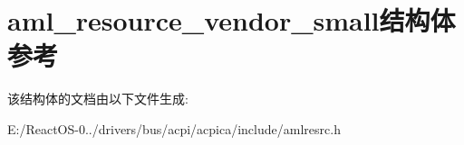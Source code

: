 \hypertarget{structaml__resource__vendor__small}{}\section{aml\+\_\+resource\+\_\+vendor\+\_\+small结构体 参考}
\label{structaml__resource__vendor__small}


该结构体的文档由以下文件生成\+:\begin{DoxyCompactItemize}
\item 
E\+:/\+React\+O\+S-\/0../drivers/bus/acpi/acpica/include/amlresrc.\+h\end{DoxyCompactItemize}

